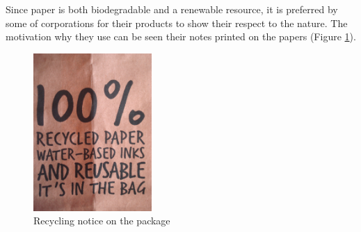 
Since paper is both biodegradable and a renewable resource, it is preferred by some of corporations for their products to show their respect to the nature. The motivation why they use can be seen their notes printed on the papers (Figure \ref{fig:NoteOnPackage}).

\begin{figure}[h!]
  \centering
  \includegraphics[height=6cm]{project_graphics/recycled_note.jpg}
  \caption{Recycling notice on the package}
  \label{fig:NoteOnPackage}
\end{figure}



